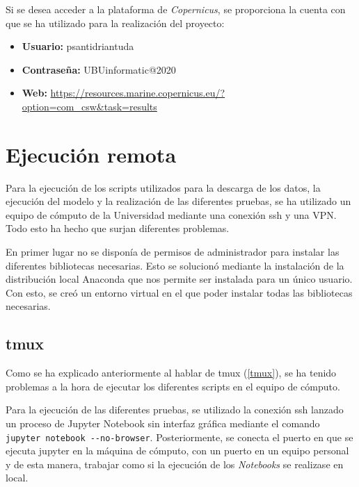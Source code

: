 Si se desea acceder a la plataforma de \emph{Copernicus}, se proporciona la cuenta con que se ha utilizado para la realización del proyecto:
\begin{itemize}
	\item \textbf{Usuario:} psantidriantuda
	\item \textbf{Contraseña:} UBUinformatic@2020
	\item \textbf{Web:} \href{https://resources.marine.copernicus.eu/?option=com_csw&task=results}{https://resources.marine.copernicus.eu/?option=com\_csw\&task=results}
\end{itemize}


\section{Ejecución remota}
Para la ejecución de los scripts utilizados para la descarga de los datos, la ejecución del modelo y la realización de las diferentes pruebas, se ha utilizado un equipo de cómputo de la Universidad mediante una conexión ssh y una VPN. Todo esto ha hecho que surjan diferentes problemas.

En primer lugar no se disponía de permisos de administrador para instalar las diferentes bibliotecas necesarias. Esto se solucionó mediante la instalación de la distribución local Anaconda que nos permite ser instalada para un único usuario. Con esto, se creó un entorno virtual en el que poder instalar todas las bibliotecas necesarias.

\subsection{tmux}
Como se ha explicado anteriormente al hablar de tmux (\ref{tmux}), se ha tenido problemas a la hora de ejecutar los diferentes scripts en el equipo de cómputo.

Para la ejecución de las diferentes pruebas, se utilizado la conexión ssh lanzado un proceso de Jupyter Notebook sin interfaz gráfica mediante el comando \verb|jupyter notebook --no-browser|. Posteriormente, se conecta el puerto en que se ejecuta jupyter en la máquina de cómputo, con un puerto en un equipo personal y de esta manera, trabajar como si la ejecución de los \emph{Notebooks} se realizase en local.


